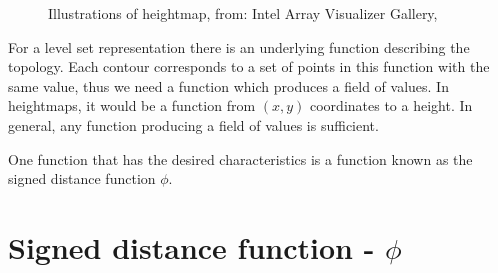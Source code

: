 \begin{figure}[h]
\begin{center}
\end{center}
\caption{Illustrations of heightmap, from: Intel Array Visualizer
  Gallery, }
\label{fig:heightmap}
\end{figure}




For a level set representation there is an underlying function
describing the topology. Each contour corresponds to a set of points
in this function with the same value, thus we need a function which
produces a field of values. In heightmaps, it would be a function from
$(x,y)$ coordinates to a height. In general, any function producing a
field of values is sufficient.  

One function that has the desired characteristics is a function known
as the signed distance function $\phi$.

\section*{Signed distance function - $\phi$}

